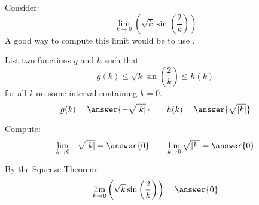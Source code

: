 \documentclass{ximera}
\author{Bart Snapp}
\begin{document}
\begin{exercise}


Consider:
\[
\lim_{k\to 0} \left(\sqrt{k} \sin \left(\frac{2}{k}\right)\right)
\]
A good way to compute this limit would be to use .
\begin{exercise}
List two functions $g$ and $h$ such that
\[
g(k)\le \sqrt{k} \sin \left(\frac{2}{k}\right) \le h(k)
\]
for all $k$ on some interval containing $k=0$.
\[
g(k)=\answer{-\sqrt{\left| k\right| }}\qquad h(k) =\answer{\sqrt{\left| k\right| }}
\]
\begin{exercise}
Compute:
\[
\lim_{k \to 0}-\sqrt{\left| k\right| } = \answer{0}\qquad \lim_{k\to 0}\sqrt{\left| k\right| } = \answer{0}
\]
\begin{exercise}
By the Squeeze Theorem:
\[
\lim_{k\to 0} \left(\sqrt{k} \sin \left(\frac{2}{k}\right)\right) = \answer{0}
\]
\end{exercise}
\end{exercise}
\end{exercise}
\end{exercise}
\end{document}
